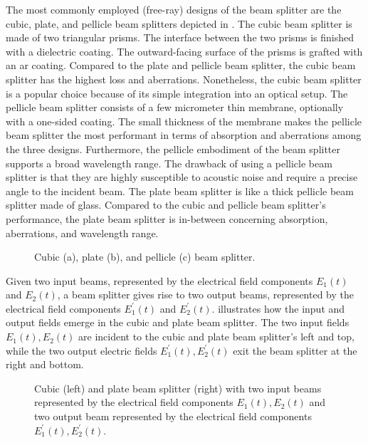 The most commonly employed (free-ray) designs of the beam splitter are the cubic, plate, and pellicle beam splitters depicted in .
The cubic beam splitter is made of two triangular prisms.
The interface between the two prisms is finished with a dielectric coating.
The outward-facing surface of the prisms is grafted with an \gls{ar} coating.
Compared to the plate and pellicle beam splitter, the cubic beam splitter has the highest loss and aberrations.
Nonetheless, the cubic beam splitter is a popular choice because of its simple integration into an optical setup.
The pellicle beam splitter consists of a few micrometer thin membrane, optionally with a one-sided coating.
The small thickness of the membrane makes the pellicle beam splitter the most performant in terms of absorption and aberrations among the three designs.
Furthermore, the pellicle embodiment of the beam splitter supports a broad wavelength range.
The drawback of using a pellicle beam splitter is that they are highly susceptible to acoustic noise and require a precise angle to the incident beam.
The plate beam splitter is like a thick pellicle beam splitter made of glass.
Compared to the cubic and pellicle beam splitter's performance, the plate beam splitter is in-between concerning absorption, aberrations, and wavelength range.
\begin{figure}[htb]
    \centering
    
    \caption{Cubic (a), plate (b), and pellicle (c) beam splitter.}\label{fig:beam_splitter_types}
\end{figure}

Given two input beams, represented by the electrical field components $E_1(t)$ and $E_2(t)$, a beam splitter gives rise to two output beams, represented by the electrical field components $E_1^\prime(t)$ and $E_2^\prime(t)$.
 illustrates how the input and output fields emerge in the cubic and plate beam splitter.
The two input fields $E_1(t),E_2(t)$ are incident to the cubic and plate beam splitter's left and top, while the two output electric fields $E_1^\prime(t),E_2^\prime(t)$ exit the beam splitter at the right and bottom.
\begin{figure}[htb]
    \centering
    
    \caption{Cubic (left) and plate beam splitter (right) with two input beams represented by the electrical field components $E_1(t),E_2(t)$ and two output beam represented by the electrical field components $E_1^\prime(t),E_2^\prime(t)$.}\label{fig:beam_splitter_cube_plate}
\end{figure}

